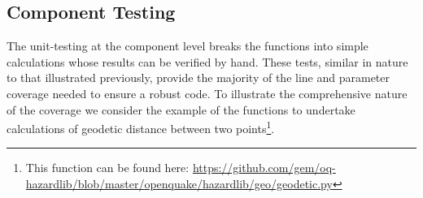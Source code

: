 \subsection{Component Testing}
The unit-testing at the component level breaks the functions into simple
calculations whose results can be verified by hand. 
These tests, similar in nature to that illustrated previously, provide 
the majority of the line and parameter coverage needed to ensure a 
robust code. To illustrate the comprehensive nature of the coverage 
we consider the example of the functions to undertake calculations of
geodetic distance between two points\footnote{This function can be found here: 
\href{https://github.com/gem/oq-hazardlib/blob/master/openquake/hazardlib/geo/geodetic.py}{https://github.com/gem/oq-hazardlib/blob/master/openquake/hazardlib/geo/geodetic.py}}. 

